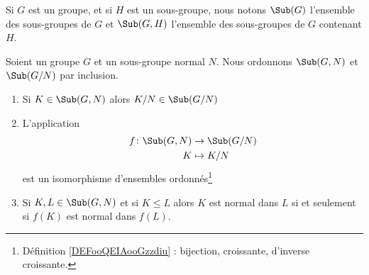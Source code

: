 \begin{normaltext}		\label{NORMooRIGBooJYzkza}
	Si \( G\) est un groupe, et si \( H\) est un sous-groupe, nous notons \( \Sub(G)\) l'ensemble des sous-groupes de \( G\) et \( \Sub(G,H)\) l'ensemble des sous-groupes de \( G\) contenant \( H\).
\end{normaltext}

\begin{theorem}	\label{THOooWONFooXDjtFX}
	Soient un groupe \( G\) et un sous-groupe normal \( N\). Nous ordonnons \( \Sub(G,N)\) et \( \Sub(G/N)\) par inclusion.
	\begin{enumerate}
		\item		\label{ITEMooSEWOooKwWYuS}
		      Si \( K\in \Sub(G,N)\) alors \( K/N\in\Sub(G/N)\)
		\item		\label{ITEMooCNVGooULzKvW}
		      L'application
		      \begin{equation}
			      \begin{aligned}
				      f\colon \Sub(G,N) & \to \Sub(G/N) \\
				      K                 & \mapsto K/N
			      \end{aligned}
		      \end{equation}
		      est un isomorphisme d'ensembles ordonnés\footnote{Définition \ref{DEFooQEIAooGzzdiu} :  bijection, croissante, d'inverse croissante.}
		\item		\label{ITEMooGKTZooSglRTh}
		      Si \( K,L\in\Sub(G,N)\) et si \( K\leq L\) alors \( K\) est normal dans \( L\) si et seulement si \( f(K) \) est normal dans \( f(L)\).
	\end{enumerate}
\end{theorem}

